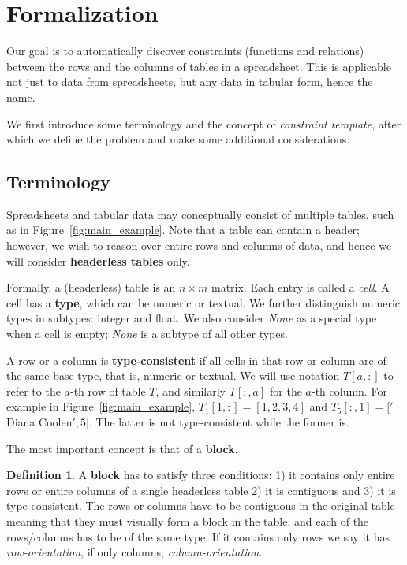 \documentclass{IEEEtran}
\newcommand{\format}[1]{\textit{#1}\xspace}
\newcommand{\template}{\format{constraint template}}
\theoremstyle{definition}
\newtheorem{definition}{Definition}
\begin{document}
\section{Formalization}\label{sec:formalization}
Our goal is to automatically discover constraints (functions and relations) between the rows and the columns of tables in a spreadsheet. This is applicable not just to data from spreadsheets, but any data in tabular form, hence the name.


We first introduce some terminology and the concept of \template, after which we define the problem and make some additional considerations.

\subsection{Terminology}
Spreadsheets and tabular data may conceptually consist of multiple tables, such as in Figure~\ref{fig:main_example}. Note that a table can contain a header; however, we wish to reason over entire rows and columns of data, and hence we will consider \textbf{headerless tables} only.

Formally, a (headerless) table is an $n \times m$ matrix. Each entry is called a \textit{cell}.
A cell has a {\bf type}, which can be numeric or textual. We further distinguish numeric types in subtypes: integer and float. We also consider \textit{None} as a special type when a cell is empty; \textit{None} is a subtype of all other types.

A row or a column is \textbf{type-consistent} if all cells in that row or column are of the same base type, that is, numeric or textual. We will use notation $T[a,{:}]$ to refer to the $a$-th row of table $T$, and similarly $T[{:},a]$ for the $a$-th column. For example in Figure~\ref{fig:main_example}, $T_1[1,:] = [1,2,3,4]$ and $T_5[:,1] = ['$Diana Coolen$', 5]$. The latter is not type-consistent while the former is.

The most important concept is that of a \textbf{block}. 
\begin{definition}
A \textbf{block} has to satisfy three conditions: 1) it contains only entire rows or entire columns of a single headerless table 2) it is contiguous and 3) it is type-consistent.
The rows or columns have to be contiguous in the original table meaning that they must visually form a block in the table; and each of the rows/columns has to be of the same type. 
If it contains only rows we say it has \textit{row-orientation}, if only columns, \textit{column-orientation}. 
\end{definition}
\end{document}
